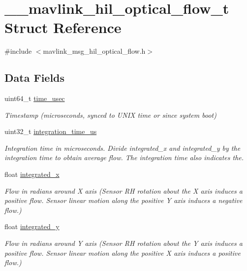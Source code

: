 \hypertarget{struct____mavlink__hil__optical__flow__t}{\section{\+\_\+\+\_\+mavlink\+\_\+hil\+\_\+optical\+\_\+flow\+\_\+t Struct Reference}
\label{struct____mavlink__hil__optical__flow__t}
}


{\ttfamily \#include $<$mavlink\+\_\+msg\+\_\+hil\+\_\+optical\+\_\+flow.\+h$>$}

\subsection*{Data Fields}
\begin{DoxyCompactItemize}
\item 
uint64\+\_\+t \hyperlink{struct____mavlink__hil__optical__flow__t_abff1e3e4ebe3954eafe38491afdf10ee}{time\+\_\+usec}
\begin{DoxyCompactList}\small\item\em Timestamp (microseconds, synced to U\+N\+I\+X time or since system boot) \end{DoxyCompactList}\item 
uint32\+\_\+t \hyperlink{struct____mavlink__hil__optical__flow__t_a0470ea8878cbdd05bc36eb8fd038ffe9}{integration\+\_\+time\+\_\+us}
\begin{DoxyCompactList}\small\item\em Integration time in microseconds. Divide integrated\+\_\+x and integrated\+\_\+y by the integration time to obtain average flow. The integration time also indicates the. \end{DoxyCompactList}\item 
float \hyperlink{struct____mavlink__hil__optical__flow__t_adc90349e5ff74dc81e4dac34c6a62351}{integrated\+\_\+x}
\begin{DoxyCompactList}\small\item\em Flow in radians around X axis (Sensor R\+H rotation about the X axis induces a positive flow. Sensor linear motion along the positive Y axis induces a negative flow.) \end{DoxyCompactList}\item 
float \hyperlink{struct____mavlink__hil__optical__flow__t_a86deaa7c99afacaa74d663e569bb9c47}{integrated\+\_\+y}
\begin{DoxyCompactList}\small\item\em Flow in radians around Y axis (Sensor R\+H rotation about the Y axis induces a positive flow. Sensor linear motion along the positive X axis induces a positive flow.) \end{DoxyCompactList}\item 

\end{DoxyCompactItemize}
